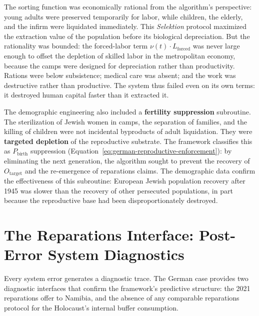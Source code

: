 The sorting function was economically rational from the algorithm's perspective: young adults were preserved temporarily for labor, while children, the elderly, and the infirm were liquidated immediately. This \textit{Selektion} protocol maximized the extraction value of the population before its biological depreciation. But the rationality was bounded: the forced-labor term $\nu(t) \cdot L_{\text{forced}}$ was never large enough to offset the depletion of skilled labor in the metropolitan economy, because the camps were designed for depreciation rather than productivity. Rations were below subsistence; medical care was absent; and the work was destructive rather than productive. The system thus failed even on its own terms: it destroyed human capital faster than it extracted it.

The demographic engineering also included a \textbf{fertility suppression} subroutine. The sterilization of Jewish women in camps, the separation of families, and the killing of children were not incidental byproducts of adult liquidation. They were \textbf{targeted depletion} of the reproductive substrate. The framework classifies this as $P_{\text{birth}}$ suppression (Equation~\ref{eq:german-reproductive-enforcement}): by eliminating the next generation, the algorithm sought to prevent the recovery of $O_{\text{target}}$ and the re-emergence of reparations claims. The demographic data confirm the effectiveness of this subroutine: European Jewish population recovery after 1945 was slower than the recovery of other persecuted populations, in part because the reproductive base had been disproportionately destroyed.

\section{The Reparations Interface: Post-Error System Diagnostics}
\label{sec:reparations}

Every system error generates a diagnostic trace. The German case provides two diagnostic interfaces that confirm the framework's predictive structure: the 2021 reparations offer to Namibia, and the absence of any comparable reparations protocol for the Holocaust's internal buffer consumption.

